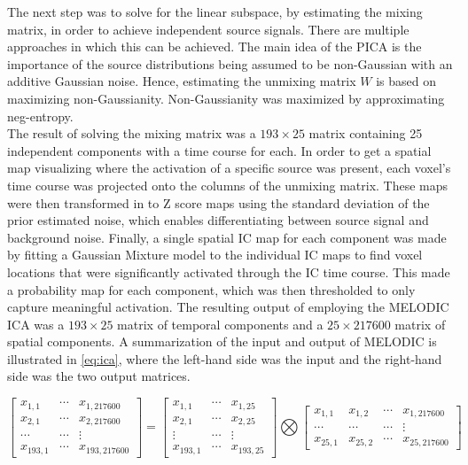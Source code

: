 The next step was to solve for the linear subspace, by estimating the mixing matrix, in order to achieve independent source signals. There are multiple approaches in which this can be achieved. The main idea of the PICA is the importance of the source distributions being assumed to be non-Gaussian with an additive Gaussian noise. Hence, estimating the unmixing matrix $W$ is based on maximizing non-Gaussianity. Non-Gaussianity was maximized by approximating neg-entropy. \\
The result of solving the mixing matrix was a $193 \times 25$ matrix containing 25 independent components with a time course for each. In order to get a spatial map visualizing where the activation of a specific source was present, each voxel's time course was projected onto the columns of the unmixing matrix. These maps were then transformed in to Z score maps using the standard deviation of the prior estimated noise, which enables differentiating between source signal and background noise. Finally, a single spatial IC map for each component was made by fitting a Gaussian Mixture model to the individual IC maps to find voxel locations that were significantly activated through the IC time course. This made a probability map for each component, which was then thresholded to only capture meaningful activation. The resulting output of employing the MELODIC ICA was a $193 \times 25$ matrix of temporal components and a $25 \times 217600$ matrix of spatial components. A summarization of the input and output of MELODIC is illustrated in \eqref{eq:ica}, where the left-hand side was the input and the right-hand side was the two output matrices. 
 
\begin{equation} \label{eq:ica}
 \begin{bmatrix}
	x_{1,1}  & \cdots & x_{1,217600} \\
	x_{2,1}  & \cdots & x_{2,217600} \\
	\cdots   & \cdots & \vdots \\
	x_{193,1}& \cdots & x_{193,217600} 
\end{bmatrix}
= 
\begin{bmatrix}
	x_{1,1}  & \cdots & x_{1,25} \\
	x_{2,1}  & \cdots & x_{2,25} \\
	\vdots   & \cdots & \vdots \\
	x_{193,1} & \cdots & x_{193,25} 
\end{bmatrix}
\bigotimes 
\begin{bmatrix}
	x_{1,1} & x_{1,2} & \cdots & x_{1,217600} \\
	\cdots & \cdots & \cdots & \vdots \\
	x_{25,1} & x_{25,2} & \cdots & x_{25,217600} 
\end{bmatrix}
\end{equation}